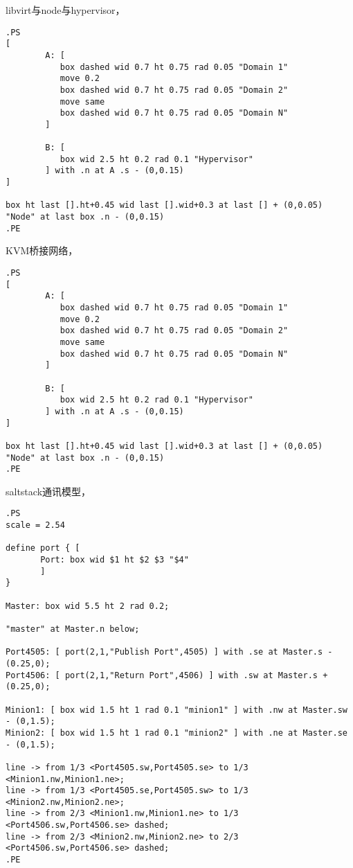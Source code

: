 libvirt与node与hypervisor，

\begin{verbatim}
.PS
[
		A: [
		   box dashed wid 0.7 ht 0.75 rad 0.05 "Domain 1"
		   move 0.2
		   box dashed wid 0.7 ht 0.75 rad 0.05 "Domain 2"
		   move same
		   box dashed wid 0.7 ht 0.75 rad 0.05 "Domain N"
		]

		B: [
		   box wid 2.5 ht 0.2 rad 0.1 "Hypervisor"
  		] with .n at A .s - (0,0.15)
]

box ht last [].ht+0.45 wid last [].wid+0.3 at last [] + (0,0.05)
"Node" at last box .n - (0,0.15)
.PE
\end{verbatim}

KVM桥接网络，

\begin{verbatim}
.PS
[
		A: [
		   box dashed wid 0.7 ht 0.75 rad 0.05 "Domain 1"
		   move 0.2
		   box dashed wid 0.7 ht 0.75 rad 0.05 "Domain 2"
		   move same
		   box dashed wid 0.7 ht 0.75 rad 0.05 "Domain N"
		]

		B: [
		   box wid 2.5 ht 0.2 rad 0.1 "Hypervisor"
  		] with .n at A .s - (0,0.15)
]

box ht last [].ht+0.45 wid last [].wid+0.3 at last [] + (0,0.05)
"Node" at last box .n - (0,0.15)
.PE
\end{verbatim}

saltstack通讯模型，

\begin{verbatim}
.PS
scale = 2.54

define port { [
       Port: box wid $1 ht $2 $3 "$4"
       ]
}

Master: box wid 5.5 ht 2 rad 0.2;

"master" at Master.n below;

Port4505: [ port(2,1,"Publish Port",4505) ] with .se at Master.s - (0.25,0);
Port4506: [ port(2,1,"Return Port",4506) ] with .sw at Master.s + (0.25,0);

Minion1: [ box wid 1.5 ht 1 rad 0.1 "minion1" ] with .nw at Master.sw - (0,1.5);
Minion2: [ box wid 1.5 ht 1 rad 0.1 "minion2" ] with .ne at Master.se - (0,1.5);

line -> from 1/3 <Port4505.sw,Port4505.se> to 1/3 <Minion1.nw,Minion1.ne>;
line -> from 1/3 <Port4505.se,Port4505.sw> to 1/3 <Minion2.nw,Minion2.ne>;
line -> from 2/3 <Minion1.nw,Minion1.ne> to 1/3 <Port4506.sw,Port4506.se> dashed;
line -> from 2/3 <Minion2.nw,Minion2.ne> to 2/3 <Port4506.sw,Port4506.se> dashed;
.PE
\end{verbatim}

